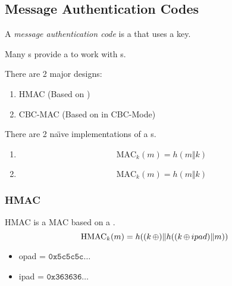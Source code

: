 \subsection{Message Authentication Codes}\label{subsec:MACs}
\begin{definition}\label{def:MAC}
  A \emph{message authentication code} is a  that uses a key.

  \begin{remark}\label{rmk:MAC_Block_Cipher_Relation}
    Many s provide a  to work with s.
  \end{remark}
\end{definition}

There are 2 major designs:
\begin{enumerate}[noitemsep]
\item HMAC (Based on )
\item CBC-MAC (Based on  in CBC-Mode)
\end{enumerate}

There are 2 na\"{\i}ve implementations of a s.
\begin{enumerate}[noitemsep]
\item
  \begin{equation*}
    \text{MAC}_{k}(m) = h(m \Vert k)
  \end{equation*}
\item
  \begin{equation*}
    \text{MAC}_{k}(m) = h(m \Vert k)
  \end{equation*}
\end{enumerate}

\subsubsection{HMAC}\label{subsubsec:HMAC}
HMAC is a MAC based on a .
\begin{equation}\label{eq:HMAC}
  \text{HMAC}_{k}(m) = h((k \operatorname{\oplus}) \Vert h((k \operatorname{\oplus} ipad) \Vert m))
\end{equation}
\begin{itemize}[noitemsep]
\item opad = $\mathtt{0x5c5c5c} \ldots$
\item ipad = $\mathtt{0x363636} \ldots$
\end{itemize}

